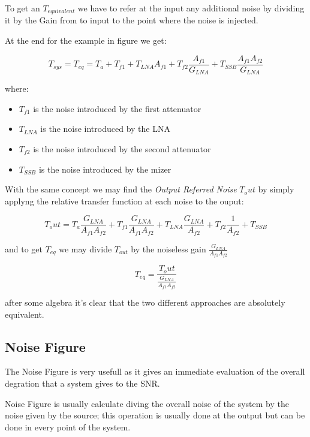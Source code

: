 To get an $T_{equivalent}$ we have to refer at the input any additional noise by dividing it by the Gain from to input to the point where the noise is injected.

At the end for the example in figure we get:

\begin{equation}
	T_{sys}=T_{eq}= T_a + T_{f1} + T_{LNA} A_{f1}+ T_{f2} \frac { A_{f1} } {G_{LNA}} + T_{SSB} \frac { A_{f1} A_{f2} } {G_{LNA}}
\end{equation}

where:
\begin{itemize}
	\item $T_{f1}$ is the noise introduced by the first attenuator
	\item $T_{LNA}$ is the noise introduced by the LNA
	\item $T_{f2}$ is the noise introduced by the second attenuator
	\item $T_{SSB}$ is the noise introduced by the mizer
\end{itemize}
With the same concept we may find the \textit{Output Referred Noise} $T_out$ by simply applyng the relative transfer function at each noise to the ouput:

\begin{equation}
	T_out = T_a\frac {G_{LNA}} {A_{f1} A_{f2} } + T_{f1}\frac { G_{LNA}} {A_{f1}A_{f2}} + T_{LNA}\frac{G_{LNA}}{A_{f2}}+ T_{f2}\frac{1}{A_{f2}} + T_{SSB} 
\end{equation}

and to get $T_{eq}$ we may divide $T_{out}$ by the noiseless gain $\frac{G_{LNA}}{A_{f1}A_{f2}}$

\begin{equation}
	T_{eq}=\frac{T_out}{\frac{G_{LNA}}{A_{f1}A_{f2}}}
\end{equation}

after some algebra it's clear that the two different approaches are absolutely equivalent.



\subsection{Noise Figure} %
\label{sub:noise_figure}

The Noise Figure is very usefull as it gives an immediate evaluation of the overall degration that a system gives to the SNR.

Noise Figure is usually  calculate diving the overall noise of the system by the noise given by the source; this operation is usually done at the output but can be done in every point of the system.

